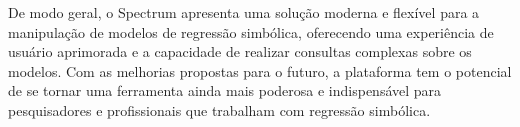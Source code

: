 De modo geral, o Spectrum apresenta uma solução moderna e flexível para a manipulação de modelos de regressão simbólica, oferecendo uma experiência de usuário aprimorada e a capacidade de realizar consultas complexas sobre os modelos. Com as melhorias propostas para o futuro, a plataforma tem o potencial de se tornar uma ferramenta ainda mais poderosa e indispensável para pesquisadores e profissionais que trabalham com regressão simbólica.
